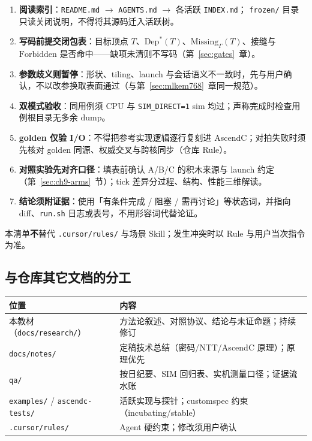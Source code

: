\documentclass[UTF8,a4paper,11pt]{ctexart}
\theoremstyle{definition}
\theoremstyle{plain}
\theoremstyle{remark}
\numberwithin{figure}{section}
\numberwithin{table}{section}
\begin{document}
\begin{enumerate}
  \item \textbf{阅读索引}：\texttt{README.md} $\to$ \texttt{AGENTS.md} $\to$ 各活跃 \texttt{INDEX.md}；
        \texttt{frozen/} 目录只读关闭说明，不得将其源码迁入活跃树。
  \item \textbf{写码前提交闭包表}：目标顶点 $T$、$\mathrm{Dep}^*(T)$、$\mathrm{Missing}_\Gamma(T)$、接缝与 $\mathrm{Forbidden}$ 是否命中——缺项未清则不写码（第~\ref{sec:gates}~章）。
  \item \textbf{参数歧义则暂停}：形状、tiling、launch 与会话语义不一致时，先与用户确认，不以改参换取表面通过（与第~\ref{sec:mlkem768}~章同一规范）。
  \item \textbf{双模式验收}：同用例须 CPU 与 \texttt{SIM\_DIRECT=1} sim 均过；声称完成时检查用例根目录无多余 dump。
  \item \textbf{golden 仅验 I/O}：不得把参考实现逻辑逐行复刻进 AscendC；对拍失败时须先核对 golden 同源、权威交叉与跨核同步（仓库 Rule）。
  \item \textbf{对照实验先对齐口径}：填表前确认 A/B/C 的积木来源与 launch 约定（第~\ref{sec:ch9-arms}~节）；tick 差异分过程、结构、性能三维解读。
  \item \textbf{结论须附证据}：使用「有条件完成 / 阻塞 / 需再讨论」等状态词，并指向 diff、\texttt{run.sh} 日志或表号，不用形容词代替论证。
\end{enumerate}

\noindent 本清单\textbf{不}替代 \texttt{.cursor/rules/} 与场景 Skill；发生冲突时以 Rule 与用户当次指令为准。

\subsection{与仓库其它文档的分工}

\begin{center}
\small
\begin{tabular}{@{}L{3.6cm}L{9.8cm}@{}}
  \toprule
  位置 & 内容 \\
  \midrule
  本教材（\texttt{docs/research/}） &
  方法论叙述、对照协议、结论与未证命题；持续修订 \\
  \texttt{docs/notes/} &
  定稿技术总结（密码/NTT/AscendC 原理）；原理优先 \\
  \texttt{qa/} &
  按日纪要、SIM 回归表、实机测量口径；证据流水账 \\
  \texttt{examples/} / \texttt{ascendc-tests/} &
  活跃实现与探针；customspec 约束（incubating/stable） \\
  \texttt{.cursor/rules/} &
  Agent 硬约束；修改须用户确认 \\
  \bottomrule
\end{tabular}
\end{center}
\end{document}
